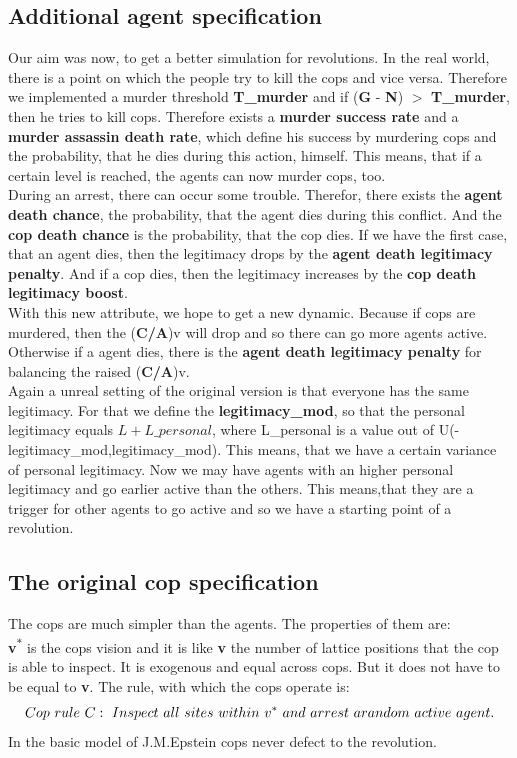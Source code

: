\documentclass[11pt]{article}
\begin{document}
\subsection{Additional agent specification}
Our aim was now, to get a better simulation for revolutions. In the real world, there is a point on which the people try to kill the cops and vice versa. Therefore we implemented a murder threshold \textbf{T\_murder} and if (\textbf{G} - \textbf{N}) $>$ \textbf{T\_murder}, then he tries to kill cops. Therefore exists a \textbf{murder success rate} and a \textbf{murder assassin death rate}, which define his success by murdering cops and the probability, that he dies during this action, himself. This means, that if a certain level is reached, the agents can now murder cops, too.  \\
During an arrest, there can occur some trouble. Therefor, there exists the \textbf{agent death chance}, the probability, that the agent dies during this conflict. And the \textbf{cop death chance} is the probability, that the cop dies.
If we have the first case, that an agent dies, then the legitimacy drops by the \textbf{agent death legitimacy penalty}. And if a cop dies, then the legitimacy increases by the \textbf{cop death legitimacy boost}.\\ 
With this new attribute, we hope to get a new dynamic. Because if cops are murdered, then the (\textbf{C/A}){\footnotesize v} will drop and so there can go more agents active. Otherwise if a agent dies, there is the \textbf{agent death legitimacy penalty} for balancing the raised  (\textbf{C/A}){\footnotesize v}. \\
Again a unreal setting of the original version is that everyone has the same legitimacy. For that we define the \textbf{legitimacy\_mod}, so that the personal legitimacy equals $L + L\_personal$, where L\_personal is a value out of U(-legitimacy\_mod,legitimacy\_mod). This means, that we have a certain variance of personal legitimacy.
Now we may have agents with an higher personal legitimacy and go earlier active than the others. This means,that they are a trigger for other agents to go active and so we have a starting point of a revolution.

\subsection{The original cop specification}
The cops are much simpler than the agents. The properties of them are:\\
\textbf{v\textsuperscript{$\ast$}} is the cops vision and it is like \textbf{v} the number of lattice positions that the cop is able to inspect. It is exogenous and equal across cops. But it does not have to be equal to \textbf{v}.
The rule, with which the cops operate is:
\begin{equation}
Cop~rule~C:~Inspect~all~ sites~ within~v\textsuperscript{$\ast$}~and~arrest~a random~active~agent.
\end{equation}
In the basic model of J.M.Epstein cops never defect to the revolution.
\end{document}
